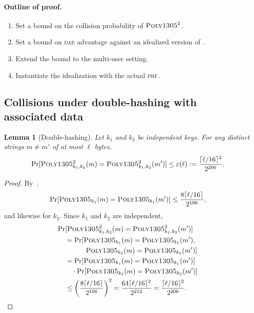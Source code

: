 \documentclass{article}
\newtheorem{lemma}{Lemma}
\def\operatorsc#1{{%
  \ifmmode\let\next=\operatorname\else\let\next=\relax\fi\next{\textsc{#1}}}}
\def\Poly#1/{\operatorsc{Poly#1}}
\def\DAENCE/{\operatorsc{Daence}}
\def\PRF{%
  \ifmmode\def\next{\operatorname{PRF}}%
    \else\def\next/{\textsc{prf}}%
  \fi\next}
\def\DAE{%
  \ifmmode\def\next{\operatorname{DAE}}%
    \else\def\next/{\textsc{dae}}%
  \fi\next}
\newcommand{\collisionbound}{\varepsilon}
\begin{document}
\paragraph*{Outline of proof.}

\begin{enumerate}
  \item Set a bound on the collision probability of $\Poly1305/^2$.
  \item Set a bound on \DAE/ advantage against an idealized version of
     \DAENCE/.
  \item Extend the bound to the multi-user setting.
  \item Instantiate the idealization with the actual \PRF/.
\end{enumerate}

\subsection{Collisions under double-hashing with associated data}

\begin{lemma}[Double-hashing]\label{double-hash}
  Let $k_1$ and $k_2$ be independent \Poly1305/ keys.
  For any distinct strings $m \ne m'$ of at most $\ell$ bytes,
  \[
    \Pr[\Poly1305/^2_{k_1,k_2}(m) = \Poly1305/^2_{k_1,k_2}(m')]
    \leq \collisionbound(\ell)
    := \frac{\lceil\ell/16\rceil^2}{2^{206}}.
  \]
\end{lemma}

\begin{proof}
  By~\cite[Theorem~3.3]{bernstein2005poly1305},
  \[
    \Pr[\Poly1305/_{k_1}(m) = \Poly1305/_{k_1}(m')]
    \leq \frac{8\lceil\ell/16\rceil}{2^{106}},
  \]
   and likewise for $k_2$.
  Since $k_1$ and $k_2$ are independent,
  \begin{align*}
    \Pr&[\Poly1305/^2_{k_1,k_2}(m) = \Poly1305/^2_{k_1,k_2}(m')] \\
    &= \Pr[\Poly1305/_{k_1}(m) = \Poly1305/_{k_1}(m'), \\
    &\qquad\quad\Poly1305/_{k_2}(m) = \Poly1305/_{k_2}(m')] \\
    &= \Pr[\Poly1305/_{k_1}(m) = \Poly1305/_{k_1}(m')] \\
    &\quad
       \cdot
       \Pr[\Poly1305/_{k_2}(m) = \Poly1305/_{k_2}(m')] \\
    &\leq \biggl(\frac{8\lceil\ell/16\rceil}{2^{106}}\biggr)^2
     = \frac{64\lceil\ell/16\rceil^2}{2^{212}}
     = \frac{\lceil\ell/16\rceil^2}{2^{206}}.
    \qedhere
  \end{align*}
\end{proof}
\end{document}
